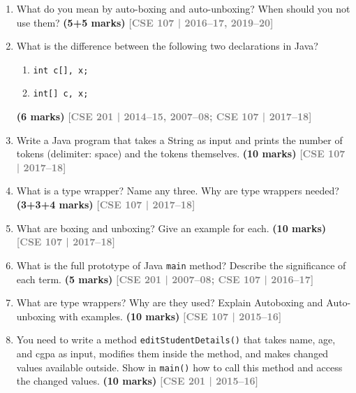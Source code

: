 \documentclass[12pt,a3paper]{article}
\newcommand{\yr}[1]{\hfill\textcolor{gray}{\small\textbf{[#1]}}}
\newcommand{\mk}[1]{\textcolor{orange!70!black}{\small\textbf{(#1 marks)}}}
\begin{document}
\begin{enumerate}



\item What do you mean by auto-boxing and auto-unboxing? When should you not use them? \mk{5+5}
\yr{CSE 107 | 2016--17, 2019--20}

\item What is the difference between the following two declarations in Java?
\begin{enumerate}
  \item \texttt{int c[], x;}
  \item \texttt{int[] c, x;}
\end{enumerate}
\mk{6}
\yr{CSE 201 | 2014--15, 2007--08; CSE 107 | 2017--18}




\item Write a Java program that takes a String as input and prints the number of tokens (delimiter: space) and the tokens themselves. \mk{10}
\yr{CSE 107 | 2017--18}




\item What is a type wrapper? Name any three. Why are type wrappers needed? \mk{3+3+4}
\yr{CSE 107 | 2017--18}

\item What are boxing and unboxing? Give an example for each. \mk{10}
\yr{CSE 107 | 2017--18}

\item What is the full prototype of Java \texttt{main} method? Describe the significance of each term. \mk{5}
\yr{CSE 201 | 2007--08; CSE 107 | 2016--17}




\item What are type wrappers? Why are they used? Explain Autoboxing and Auto-unboxing with examples. \mk{10}
\yr{CSE 107 | 2015--16}

\item You need to write a method \texttt{editStudentDetails()} that takes name, age, and cgpa as input, modifies them inside the method, and makes changed values available outside. Show in \texttt{main()} how to call this method and access the changed values. \mk{10}
\yr{CSE 201 | 2015--16}


\end{enumerate}
\end{document}
